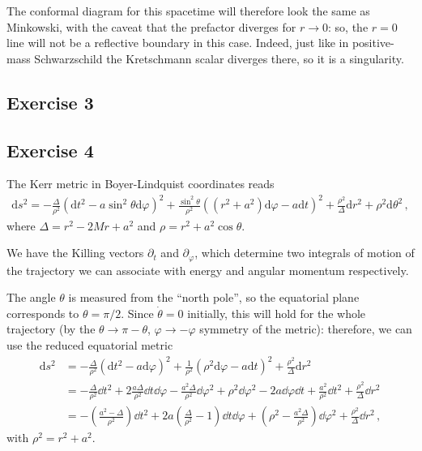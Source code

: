 \documentclass[main.tex]{subfiles}
\begin{document}
The conformal diagram for this spacetime will therefore look the same as Minkowski, 
with the caveat that the prefactor diverges for \(r \to 0\): so, the 
\(r = 0 \) line will not be a reflective boundary in this case. 
Indeed, just like in positive-mass Schwarzschild the Kretschmann scalar diverges there, 
so it is a singularity.



\subsection{Exercise 3}
\subsection{Exercise 4}

The Kerr metric in Boyer-Lindquist coordinates reads %
\begin{align}
\mathrm{d}s^2 = - \frac{\Delta}{\rho^2} 
\left(\mathrm{d}t^2 - a \sin^2 \theta \mathrm{d}\varphi \right)^2
+ \frac{\sin^2 \theta}{\rho^2}
\left( (r^2 + a^2) \mathrm{d}\varphi - a \mathrm{d}t\right)^2
+ \frac{\rho^2}{\Delta } \mathrm{d}r^2 + \rho^2 \mathrm{d}\theta^2
\,,
\end{align}
%
where \(\Delta = r^2 - 2Mr + a^2\) and \(\rho = r^2 + a^2 \cos \theta \).

We have the Killing vectors \(\partial_t\) and \(\partial_\varphi \), which determine two integrals of motion of the trajectory we can associate with energy and angular momentum respectively. 

The angle \(\theta\) is measured from the ``north pole'', so the equatorial plane corresponds to \(\theta = \pi / 2\). Since \(\dot{\theta} = 0\) initially, this will hold for the whole trajectory (by the \(\theta \to \pi - \theta \), \(\varphi \to - \varphi \) symmetry of the metric): therefore, we can use the reduced equatorial metric %
\begin{align}
\mathrm{d}s^2 &= - \frac{\Delta}{\rho^2} 
\left(\mathrm{d}t^2 - a \mathrm{d}\varphi \right)^2
+ \frac{1}{\rho^2}
\left( \rho^2 \mathrm{d}\varphi - a \mathrm{d}t\right)^2
+ \frac{\rho^2}{\Delta } \mathrm{d}r^2   \\
&= 
- \frac{\Delta}{\rho^2} \dd{t^2} 
+ 2 \frac{a \Delta }{\rho^2} \dd{t} \dd{\varphi } 
- \frac{a^2\Delta }{\rho^2} \dd{\varphi^2} 
+ \rho^2 \dd{\varphi^2} 
- 2a \dd{\varphi } \dd{t} + \frac{a^2}{\rho^2} \dd{t}^2 + \frac{\rho^2}{\Delta } \dd{r^2}  \\
&= - \left( \frac{a^2 - \Delta }{\rho^2}\right) \dd{t^2} 
+ 2a \left( \frac{\Delta}{\rho^2} - 1 \right) \dd{t} \dd{\varphi } 
+ \left(\rho^2 - \frac{a^2 \Delta }{\rho^2}\right) \dd{\varphi^2} + \frac{\rho^2}{\Delta } \dd{r^2}
\,,
\end{align}
%
with \(\rho^2 = r^2 + a^2\). 
\end{document}
